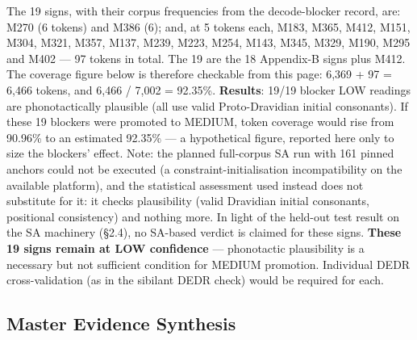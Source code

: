 \documentclass[11pt]{article}
\begin{document}
The 19 signs, with their corpus frequencies from the decode-blocker record, are: M270 (6 tokens) and M386 (6); and, at 5 tokens each, M183, M365, M412, M151, M304, M321, M357, M137, M239, M223, M254, M143, M345, M329, M190, M295 and M402 --- 97 tokens in total. The 19 are the 18 Appendix-B signs plus M412. The coverage figure below is therefore checkable from this page: 6,369 + 97 = 6,466 tokens, and 6,466 / 7,002 = 92.35\%. \textbf{Results}: 19/19
blocker LOW readings are phonotactically plausible (all use valid
Proto-Dravidian initial consonants). If these 19 blockers were promoted to MEDIUM, token coverage would rise from 90.96\% to an estimated 92.35\% --- a hypothetical figure, reported here only to size the blockers' effect. Note: the planned full-corpus SA run with 161 pinned anchors could not be executed (a constraint-initialisation incompatibility on the available platform), and the statistical assessment used instead does not substitute for it: it checks plausibility (valid Dravidian initial consonants, positional consistency) and nothing more. In light of the held-out test result on the SA machinery (§2.4), no SA-based verdict is claimed for these signs. \textbf{These 19
signs remain at LOW confidence} --- phonotactic plausibility is a
necessary but not sufficient condition for MEDIUM promotion. Individual
DEDR cross-validation (as in the sibilant DEDR check) would be required for each.

\subsection{Master Evidence Synthesis
}\label{master-evidence-synthesis-phase-169}
\end{document}
